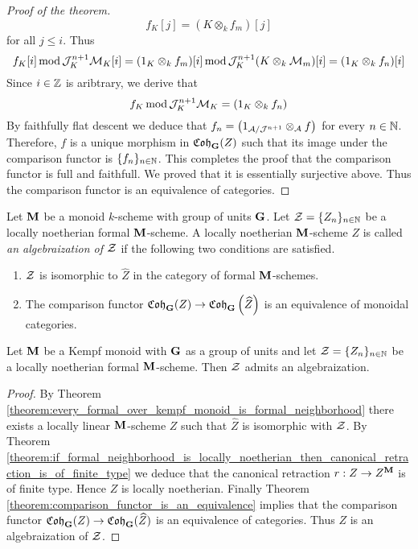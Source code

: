 \begin{proof}[Proof of the theorem]
$$f_K[j] = (K\otimes_kf_m)[j]$$
for all $j \leq i$. Thus
$$f_K[i]\,\mathrm{mod}\,{\mathcal J}_K^{n+1}{\mathcal M}_K[i] = (1_K\otimes_kf_m)[i]\,\mathrm{mod}\,{\mathcal J}_K^{n+1}(K\otimes_k{\mathcal M}_m)[i] = (1_K\otimes_kf_n)[i]$$
Since $i\in {\mathbb Z}$ is aribtrary, we derive that
$$f_K\,\mathrm{mod}\,{\mathcal J}_K^{n+1}{\mathcal M}_K = (1_K\otimes_kf_n)$$
By faithfully flat descent we deduce that $f_n = \left(1_{{\mathcal A}/{\mathcal J}^{n+1}}\otimes_{{\mathcal A}}f\right)$ for every $n\in {\mathbb N}$. Therefore,  $f$ is a unique morphism in $\mathfrak{Coh}_{\mathbf{G}}(Z)$ such that its image under the comparison functor is $\{f_n\}_{n\in {\mathbb N}}$. This completes the proof that the comparison functor is full and faithfull. We proved that it is essentially surjective above. Thus the comparison functor is an equivalence of categories.
\end{proof}

\begin{definition}
Let $\mathbf{M}$ be a monoid $k$-scheme with group of units $\mathbf{G}$. Let ${\mathcal Z} = \{Z_n\}_{n\in \mathbb{N}}$ be a locally noetherian formal $\mathbf{M}$-scheme. A locally noetherian $\mathbf{M}$-scheme $Z$ is called \textit{an algebraization of ${\mathcal Z}$} if the following two conditions are satisfied.
\begin{enumerate}[label=\textbf{(\arabic*)}, leftmargin=3.0em]
\item ${\mathcal Z}$ is isomorphic to $\widehat{Z}$ in the category of formal $\mathbf{M}$-schemes.
\item The comparison functor $\mathfrak{Coh}_{\mathbf{G}}(Z)\rightarrow \mathfrak{Coh}_{\mathbf{G}}\left(\widehat{Z}\right)$ is an equivalence of monoidal categories.
\end{enumerate}
\end{definition}

\begin{corollary}\label{corollary:existence_of_algebraization}
Let $\mathbf{M}$ be a Kempf monoid with $\mathbf{G}$ as a group of units and let ${\mathcal Z} = \{Z_n\}_{n\in {\mathbb N}}$ be a locally noetherian formal $\mathbf{M}$-scheme. Then ${\mathcal Z}$ admits an algebraization.
\end{corollary}
\begin{proof}
By Theorem \ref{theorem:every_formal_over_kempf_monoid_is_formal_neighborhood} there exists a locally linear $\mathbf{M}$-scheme $Z$ such that $\widehat{Z}$ is isomorphic with ${\mathcal Z}$. By Theorem \ref{theorem:if_formal_neighborhood_is_locally_noetherian_then_canonical_retraction_is_of_finite_type} we deduce that the canonical retraction $r:Z\rightarrow Z^{\mathbf{M}}$ is of finite type. Hence $Z$ is locally noetherian. Finally Theorem \ref{theorem:comparison_functor_is_an_equivalence} implies that the comparison functor $\mathfrak{Coh}_{\mathbf{G}}(Z) \rightarrow \mathfrak{Coh}_{\mathbf{G}}(\widehat{Z})$ is an equivalence of categories. Thus $Z$ is an algebraization of ${\mathcal Z}$.
\end{proof}



\small




